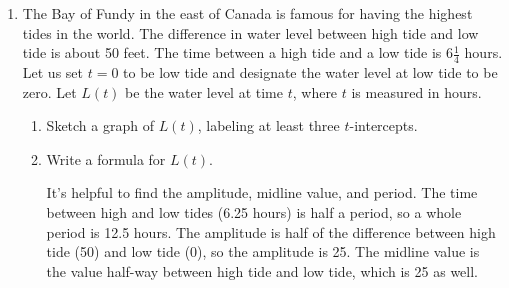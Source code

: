 \documentclass{article}
\begin{document}
\begin{enumerate}
\begin{enumerate}
\begin{solution}
      (What we've done here is really linear approximation.) 
    \end{solution}

  \end{enumerate}

\item \label{spring2011-mb-midterm1-revisit-2-expanded}  

The Bay of Fundy in the east of Canada is famous for having the highest
  tides in the world.  The difference in water level between high tide and
  low tide is about 50 feet.  The time between a high tide and a low tide
  is $ 6 \frac{1}{4}$ hours. Let us set $t=0$ to be low tide and designate
  the water level at low tide to be zero. Let $L(t)$ be the water level at
  time $t$, where $t$ is measured in hours.

  \begin{enumerate}
  \item
    \begin{problem}[\vfill]
      Sketch a graph of $L(t)$, labeling at least three $t$-intercepts.
    \end{problem}

    \begin{solution}
      \begin{center}
      \end{center}
    \end{solution}

  \item
    \begin{problem}[\stretch{0.5}]
      Write a formula for $L(t)$.
    \end{problem}

    \begin{solution}
      It's helpful to find the amplitude, midline value, and period.  The
      time between high and low tides (6.25 hours) is half a period, so a
      whole period is 12.5 hours.  The amplitude is half of the difference
      between high tide (50) and low tide (0), so the amplitude is 25.
      The midline value is the value half-way between high tide and low
      tide, which is 25 as well.


\end{solution}
\end{enumerate}
\end{enumerate}
\end{document}
